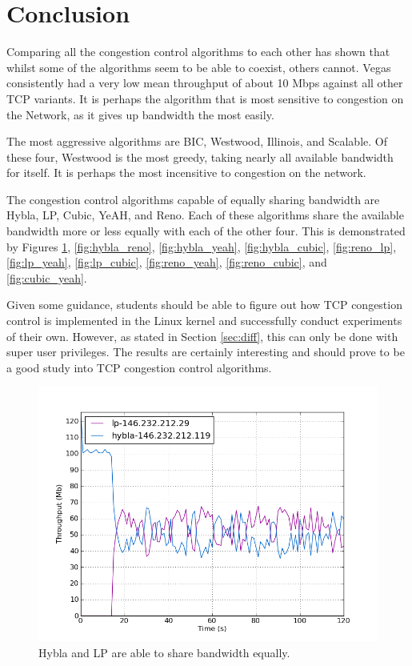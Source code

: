 \documentclass[11pt,a4paper,twocolumn]{article}
\begin{document}
\section{Conclusion}
\label{sec:conc}
Comparing all the congestion control algorithms to each other has shown that whilst some of the algorithms
seem to be able to coexist, others cannot. Vegas consistently had a very low mean throughput of about 10 Mbps
against all other TCP variants. It is perhaps the algorithm that is most sensitive to congestion on the Network, as it gives up bandwidth the most easily. 

The most aggressive algorithms are BIC, Westwood, Illinois, and Scalable. Of these four, Westwood is the most
greedy, taking nearly all available bandwidth for itself. It is perhaps the most incensitive to congestion on the network.

The congestion control algorithms capable of equally sharing bandwidth are Hybla, LP, Cubic, YeAH, and Reno.
Each of these algorithms share the available bandwidth more or less equally with each of the other four. This is demonstrated by Figures \ref{fig:hybla_lp}, \ref{fig:hybla_reno}, \ref{fig:hybla_yeah}, \ref{fig:hybla_cubic}, \ref{fig:reno_lp}, \ref{fig:lp_yeah}, \ref{fig:lp_cubic}, \ref{fig:reno_yeah}, \ref{fig:reno_cubic}, and \ref{fig:cubic_yeah}.

Given some guidance, students should be able to figure out how TCP congestion control is implemented in the Linux kernel and successfully conduct experiments of their own.
However, as stated in Section \ref{sec:diff}, this can only be done with super user privileges. The results are certainly interesting and should prove to be a good study into
TCP congestion control algorithms.

\begin{figure}[p]
	\includegraphics[width=\linewidth]{exp14.png}
	\caption{Hybla and LP are able to share bandwidth equally.}
	\label{fig:hybla_lp}
\end{figure}
\end{document}
